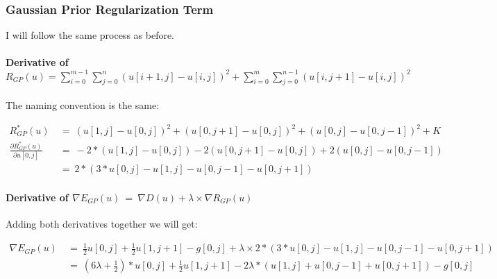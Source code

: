 \documentclass{report}
\begin{document}
			\subsubsection{Gaussian Prior Regularization Term}
			\startsubsection
				I will follow the same process as before.
				\vspace{-0.4cm} \paragraph{Derivative of $R_{GP}(u) = \sum_{i=0}^{m-1} \sum_{j=0}^{n} ( u[i+1,j] - u[i,j] )^2 + \sum_{i=0}^{m} \sum_{j=0}^{n-1} ( u[i,j+1] - u[i,j] )^2$}
				\startsubsection
					\vspace{0.2cm} The naming convention is the same:
				\closesection
				\begin{adjustwidth}{-4em}{}
					\vspace{-0.5cm}
					\begin{align*}
						R_{GP}^*(u) \ & = \ (u[1,j] - u[0,j])^2 + (u[0,j+1] - u[0,j])^2 + (u[0,j] - u[0,j-1])^2 + K \\
						\frac{\partial R_{GP}^*(u)}{\partial u[0,j]} \ & = \ -2 * (u[1,j] - u[0,j]) - 2 (u[0,j+1] - u[0,j]) + 2 (u[0,j] - u[0,j-1]) \\
						& = \ 2 * (3 * u[0,j] - u[1,j] - u[0,j-1] - u[0,j+1])
					\end{align*}
				\end{adjustwidth}
				\vspace{-0.4cm} \paragraph{Derivative of $\nabla E_{GP}(u) \ = \ \nabla D(u) + \lambda \times \nabla R_{GP}(u)$}
				\startsubsection
					Adding both derivatives together we will get:
				\closesection
				\begin{adjustwidth}{-7em}{}
					\vspace{-0.6cm}
					\begin{align*}
						\nabla E_{GP}(u) \ & = \ \frac{1}{2} u[0,j]  + \frac{1}{2} u[1,j+1] - g[0,j] + \lambda \times 2 * (3 * u[0,j] - u[1,j] - u[0,j-1] - u[0,j+1]) \\
						& = \ (6 \lambda + \frac{1}{2}) * u[0,j]  + \frac{1}{2} u[1,j+1] - 2\lambda*(u[1,j] + u[0,j-1] + u[0,j+1]) - g[0,j]
					\end{align*}
				\end{adjustwidth}
			\closesection
\end{document}
